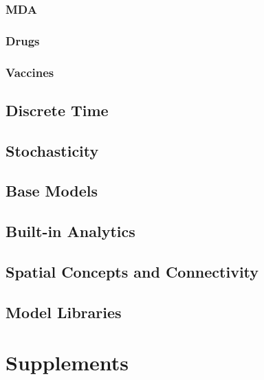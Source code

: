 \documentclass[
]{book}
\begin{document}
\hypertarget{mda-1}{%
\section{MDA}\label{mda-1}}

\hypertarget{drugs-1}{%
\section{Drugs}\label{drugs-1}}

\hypertarget{vaccines-1}{%
\section{Vaccines}\label{vaccines-1}}

\hypertarget{discrete-time}{%
\chapter{Discrete Time}\label{discrete-time}}

\hypertarget{stochasticity}{%
\chapter{Stochasticity}\label{stochasticity}}

\hypertarget{base-models}{%
\chapter{Base Models}\label{base-models}}

\hypertarget{built-in-analytics}{%
\chapter{Built-in Analytics}\label{built-in-analytics}}

\hypertarget{spatial-concepts-and-connectivity}{%
\chapter{Spatial Concepts and Connectivity}\label{spatial-concepts-and-connectivity}}

\hypertarget{model-libraries}{%
\chapter{Model Libraries}\label{model-libraries}}

\hypertarget{part-supplements}{%
\part{Supplements}\label{part-supplements}}
\end{document}

